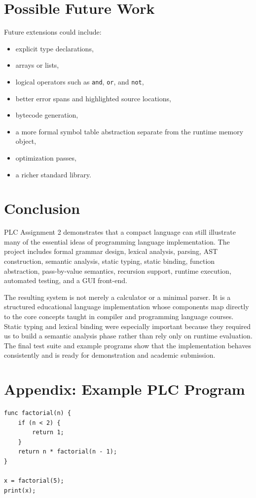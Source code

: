 \documentclass[12pt,a4paper]{article}
\begin{document}
\section{Possible Future Work}
Future extensions could include:

\begin{itemize}[leftmargin=1.0cm]
    \item explicit type declarations,
    \item arrays or lists,
    \item logical operators such as \texttt{and}, \texttt{or}, and \texttt{not},
    \item better error spans and highlighted source locations,
    \item bytecode generation,
    \item a more formal symbol table abstraction separate from the runtime memory object,
    \item optimization passes,
    \item a richer standard library.
\end{itemize}

\section{Conclusion}
PLC Assignment 2 demonstrates that a compact language can still illustrate many of the essential ideas of programming language implementation. The project includes formal grammar design, lexical analysis, parsing, AST construction, semantic analysis, static typing, static binding, function abstraction, pass-by-value semantics, recursion support, runtime execution, automated testing, and a GUI front-end.

The resulting system is not merely a calculator or a minimal parser. It is a structured educational language implementation whose components map directly to the core concepts taught in compiler and programming language courses. Static typing and lexical binding were especially important because they required us to build a semantic analysis phase rather than rely only on runtime evaluation. The final test suite and example programs show that the implementation behaves consistently and is ready for demonstration and academic submission.

\appendix
\section{Appendix: Example PLC Program}
\begin{lstlisting}
func factorial(n) {
    if (n < 2) {
        return 1;
    }
    return n * factorial(n - 1);
}

x = factorial(5);
print(x);
\end{lstlisting}
\end{document}
